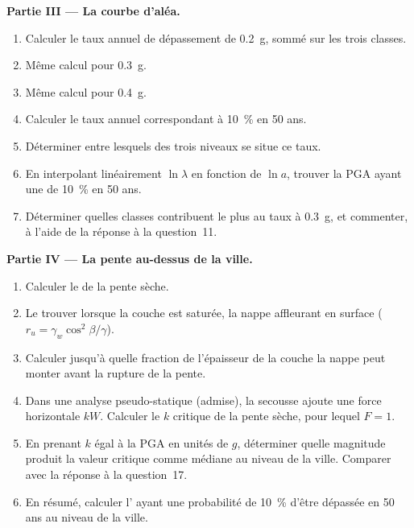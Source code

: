 \begin{problem}
\noindent\textbf{Partie III --- La courbe d'aléa.}
\begin{enumerate}[resume]
\item Calculer le taux annuel de dépassement de \qty{0.2}{g}, sommé sur les trois classes.
\item Même calcul pour \qty{0.3}{g}.
\item Même calcul pour \qty{0.4}{g}.
\item Calculer le taux annuel correspondant à \qty{10}{\percent} en 50 ans.
\item Déterminer entre lesquels des trois niveaux se situe ce taux.
\item En interpolant linéairement $\ln\lambda$ en fonction de $\ln a$, trouver
la PGA ayant une  de \qty{10}{\percent} en 50 ans.
\item Déterminer quelles classes contribuent le plus au taux à
\qty{0.3}{g}, et commenter, à l'aide de la réponse à la question~11.
\end{enumerate}

\noindent\textbf{Partie IV --- La pente au-dessus de la ville.}
\begin{enumerate}[resume]
\item Calculer le  de la pente sèche.
  \item Le trouver lorsque la couche est saturée, la nappe affleurant en surface ($r_u =
        \gamma_w\cos^2\beta/\gamma$).
\item Calculer jusqu'à quelle fraction de l'épaisseur de la couche la nappe peut monter avant la rupture de la pente.
\item Dans une analyse pseudo-statique (admise), la secousse ajoute une force
horizontale $kW$. Calculer le $k$ critique de la pente sèche, pour lequel $F = 1$.
\item En prenant $k$ égal à la PGA en unités de $g$, déterminer quelle magnitude produit la
valeur critique comme médiane au niveau de la ville. Comparer avec la réponse à la question~17.
\item En résumé, calculer l' ayant une probabilité
de \qty{10}{\percent} d'être dépassée en 50 ans au niveau de la ville.
\end{enumerate}
\end{problem}
